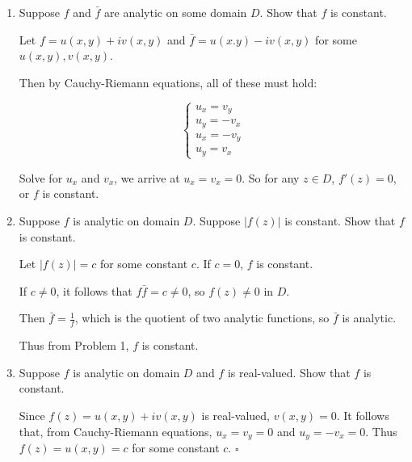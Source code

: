 \documentclass[12pt]{article}
\begin{document}
\begin{enumerate}
    \item Suppose $f$ and $\bar f$ are analytic on some domain $D$. Show that $f$ is constant.

    Let $f = u(x,y) + iv(x,y)$ and $\bar f = u(x.y) - iv(x,y)$ for some $u(x,y), v(x,y)$.

    Then by Cauchy-Riemann equations, all of these must hold:

    \begin{equation*}
    \begin{cases}
    u_x = v_y\\
    u_y = -v_x\\
    u_x = -v_y\\
    u_y = v_x
    \end{cases}
    \end{equation*}

    Solve for $u_x$ and $v_x$, we arrive at $u_x = v_x = 0$. So for any $z \in D$, $f'(z) = 0$, or $f$ is constant.

    \item Suppose $f$ is analytic on domain $D$. Suppose $|f(z)|$ is constant. Show that $f$ is constant.

   Let $|f(z)| = c$ for some constant $c$. 
   If $c=0$, $f$ is constant. 
   
   If $c\not = 0$, it follows that $f\bar f = c \not = 0$, so $f(z) \not = 0$ in $D$.

   Then $\bar f = \frac{1}{f}$, which is the quotient of two analytic functions, so $\bar f$ is analytic. 

   Thus from Problem 1, $f$ is constant.

   \item Suppose $f$ is analytic on domain $D$ and $f$ is real-valued. Show that $f$ is constant.

   Since $f(z) = u(x,y) + iv(x,y)$ is real-valued, $v(x,y) = 0$. It follows that, from Cauchy-Riemann equations, $u_x = v_y =0$ and $u_y = -v_x = 0$. Thus $ f(z) = u(x,y) = c$ for some constant $c$. $\square$
   
   \end{enumerate}
\end{document}
